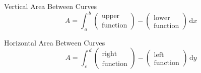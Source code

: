 \documentclass[11pt,a4paper]{book}
\begin{document}
\begin{tcolorbox}[colback=blue!5, colframe=black, boxrule=.4pt, sharpish corners]
Vertical Area Between Curves
\begin{equation*}A = \int_{{\,a}}^{{\,b}}{{\left( \begin{array}{c}{\mbox{upper}}\\ {\mbox{function}}\end{array} \right) - \left( \begin{array}{c}{\mbox{lower}}\\ {\mbox{function}}\end{array} \right)\,\mathrm{d}x}} \end{equation*}

Horizontal Area Between Curves
\begin{equation*}A = \int_{{\,c}}^{{\,d}}{{\left( \begin{array}{c}{\mbox{right}}\\ {\mbox{function}}\end{array} \right) - \left( \begin{array}{c}{\mbox{left}}\\  {\mbox{function}}\end{array} \right)\,\mathrm{d}y}} \end{equation*}
\end{tcolorbox}

\newpage
\end{document}
